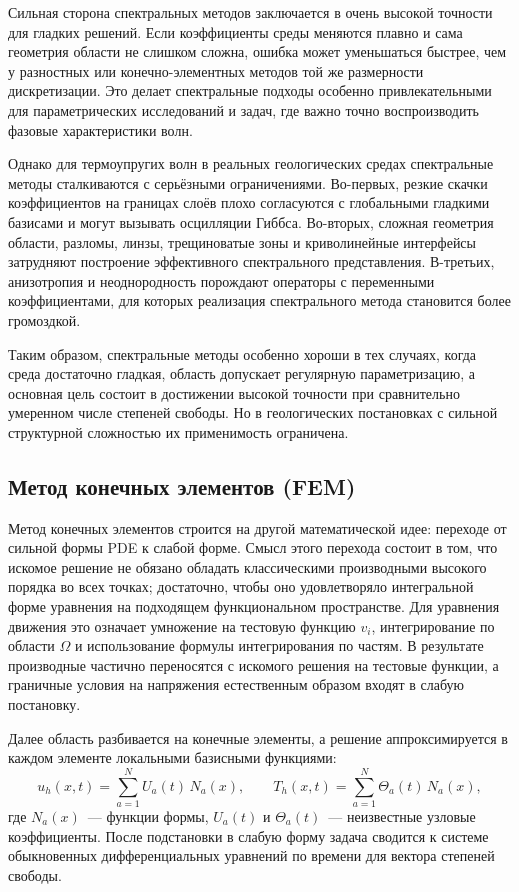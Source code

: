 Сильная сторона спектральных методов заключается в очень высокой точности для гладких решений. Если коэффициенты среды меняются плавно и сама геометрия области не слишком сложна, ошибка может уменьшаться быстрее, чем у разностных или конечно-элементных методов той же размерности дискретизации. Это делает спектральные подходы особенно привлекательными для параметрических исследований и задач, где важно точно воспроизводить фазовые характеристики волн.

Однако для термоупругих волн в реальных геологических средах спектральные методы сталкиваются с серьёзными ограничениями. Во-первых, резкие скачки коэффициентов на границах слоёв плохо согласуются с глобальными гладкими базисами и могут вызывать осцилляции Гиббса. Во-вторых, сложная геометрия области, разломы, линзы, трещиноватые зоны и криволинейные интерфейсы затрудняют построение эффективного спектрального представления. В-третьих, анизотропия и неоднородность порождают операторы с переменными коэффициентами, для которых реализация спектрального метода становится более громоздкой.

Таким образом, спектральные методы особенно хороши в тех случаях, когда среда достаточно гладкая, область допускает регулярную параметризацию, а основная цель состоит в достижении высокой точности при сравнительно умеренном числе степеней свободы. Но в геологических постановках с сильной структурной сложностью их применимость ограничена.

\subsection*{Метод конечных элементов (FEM)}

Метод конечных элементов строится на другой математической идее: переходе от сильной формы PDE к слабой форме. Смысл этого перехода состоит в том, что искомое решение не обязано обладать классическими производными высокого порядка во всех точках; достаточно, чтобы оно удовлетворяло интегральной форме уравнения на подходящем функциональном пространстве. Для уравнения движения это означает умножение на тестовую функцию $v_i$, интегрирование по области $\Omega$ и использование формулы интегрирования по частям. В результате производные частично переносятся с искомого решения на тестовые функции, а граничные условия на напряжения естественным образом входят в слабую постановку.

Далее область разбивается на конечные элементы, а решение аппроксимируется в каждом элементе локальными базисными функциями:
\begin{equation}
u_h(x,t)=\sum_{a=1}^{N} U_a(t)\,N_a(x), \qquad
T_h(x,t)=\sum_{a=1}^{N} \Theta_a(t)\,N_a(x),
\end{equation}
где $N_a(x)$~--- функции формы, $U_a(t)$ и $\Theta_a(t)$~--- неизвестные узловые коэффициенты. После подстановки в слабую форму задача сводится к системе обыкновенных дифференциальных уравнений по времени для вектора степеней свободы.

